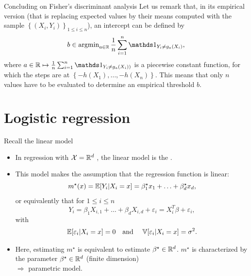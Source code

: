 \documentclass[xcolor={usenames,dvipsnames},handout]{beamer}
\begin{document}
\begin{frame}{Concluding on Fisher's discriminant analysis }
	Let us remark that, in its empirical version (that is replacing expected values by their means computed with the sample $\left\{(X_i, Y_i)\right\}_{1 \le i \le n}$), an intercept can be defined by
	$$
		b \in \argmin_{a \in \R} \frac 1n \sum_{i=1}^n \one_{Y_i \neq g_a(X_i)},
	$$
	where $a \in \R \mapsto \frac 1n \sum_{i=1}^n \one_{Y_i \neq g_a(X_i))}$ is a piecewise constant function, for which the steps are at $\left\{ -h(X_1), \dots, -h(X_n) \right\}$.
	This means that only $n$ values have to be evaluated to determine an empirical threshold $b$.

\end{frame}



\section{Logistic regression}




\begin{frame}{Recall the linear model}
\begin{itemize}
\item In regression with ${\mathcal{X}} = \mathbb{R}^d$ , the linear model is the .
\pause 
\item This model makes the assumption that the regression function is linear: 
$$
m^\star(x)=\mathbb{E} [Y_i|X_i=x]= \beta_1^\star x_1+\hdots +\beta_d^\star x_d,
$$
or equivalently that for $1\leq i \leq n$
$$
Y_i = \beta_1 X_{i,1} + \hdots +  \beta_d X_{i,d} + \varepsilon_i = X_i^T \beta +\varepsilon_i,
$$
with 
$$
\mathbb{E} [ \varepsilon_i | X_i=x ] = 0 \quad \text{and } \quad \mathbb{V} [ \varepsilon_i | X_i=x ] = \sigma^2.
$$
\item Here, estimating $m^\star$ is equivalent to estimate $\beta^\star \in \mathbb{R}^d$.
$m^\star$ is characterized by the parameter $\beta^\star \in \mathbb{R}^d$ (finite dimension) \\ $\Rightarrow$ parametric model.  
\end{itemize} 
\end{frame}
\end{document}

